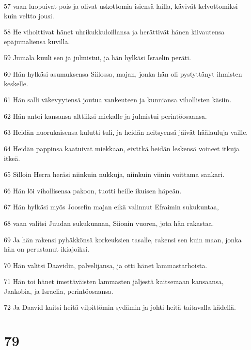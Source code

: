 \par 57 vaan luopuivat pois ja olivat uskottomia isiensä lailla, kävivät kelvottomiksi kuin veltto jousi.
\par 58 He vihoittivat hänet uhrikukkuloillansa ja herättivät hänen kiivautensa epäjumaliensa kuvilla.
\par 59 Jumala kuuli sen ja julmistui, ja hän hylkäsi Israelin peräti.
\par 60 Hän hylkäsi asumuksensa Siilossa, majan, jonka hän oli pystyttänyt ihmisten keskelle.
\par 61 Hän salli väkevyytensä joutua vankeuteen ja kunniansa vihollisten käsiin.
\par 62 Hän antoi kansansa alttiiksi miekalle ja julmistui perintöosaansa.
\par 63 Heidän nuorukaisensa kulutti tuli, ja heidän neitsyensä jäivät häälauluja vaille.
\par 64 Heidän pappinsa kaatuivat miekkaan, eivätkä heidän leskensä voineet itkuja itkeä.
\par 65 Silloin Herra heräsi niinkuin nukkuja, niinkuin viinin voittama sankari.
\par 66 Hän löi vihollisensa pakoon, tuotti heille ikuisen häpeän.
\par 67 Hän hylkäsi myös Joosefin majan eikä valinnut Efraimin sukukuntaa,
\par 68 vaan valitsi Juudan sukukunnan, Siionin vuoren, jota hän rakastaa.
\par 69 Ja hän rakensi pyhäkkönsä korkeuksien tasalle, rakensi sen kuin maan, jonka hän on perustanut ikiajoiksi.
\par 70 Hän valitsi Daavidin, palvelijansa, ja otti hänet lammastarhoista.
\par 71 Hän toi hänet imettäväisten lammasten jäljestä kaitsemaan kansaansa, Jaakobia, ja Israelia, perintöosaansa.
\par 72 Ja Daavid kaitsi heitä vilpittömin sydämin ja johti heitä taitavalla kädellä.

\chapter{79}

